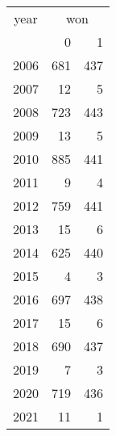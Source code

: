 \footnotesize\begin{tabular}[t]{lrr}
\toprule
\multicolumn{1}{c}{year} & \multicolumn{2}{c}{won} \\
\cmidrule(l{3pt}r{3pt}){1-1} \cmidrule(l{3pt}r{3pt}){2-3}
  & 0 & 1\\
\midrule
2006 & 681 & 437\\
2007 & 12 & 5\\
2008 & 723 & 443\\
2009 & 13 & 5\\
2010 & 885 & 441\\
2011 & 9 & 4\\
2012 & 759 & 441\\
2013 & 15 & 6\\
2014 & 625 & 440\\
2015 & 4 & 3\\
2016 & 697 & 438\\
2017 & 15 & 6\\
2018 & 690 & 437\\
2019 & 7 & 3\\
2020 & 719 & 436\\
2021 & 11 & 1\\
\bottomrule
\end{tabular}
